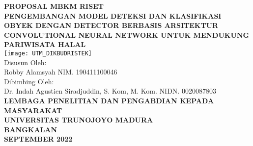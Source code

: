 \begin{titlepage}
\begin{center}
    \textbf{PROPOSAL MBKM RISET}\\[3\baselineskip]

    \textbf{PENGEMBANGAN MODEL DETEKSI DAN KLASIFIKASI OBYEK DENGAN DETECTOR BERBASIS ARSITEKTUR CONVOLUTIONAL NEURAL NETWORK UNTUK MENDUKUNG PARIWISATA HALAL}\\[8\baselineskip]

    \texttt{[image: UTM\_DIKBUDRISTEK]}\\[3\baselineskip]

    Disusun Oleh:\\
    Robby Alamsyah NIM. 190411100046\\[1\baselineskip]

    Dibimbing Oleh:\\
    Dr. Indah Agustien Siradjuddin, S. Kom, M. Kom. NIDN. 0020087803\\[8\baselineskip]


    \textbf{LEMBAGA PENELITIAN DAN PENGABDIAN KEPADA MASYARAKAT}\\
    \textbf{UNIVERSITAS TRUNOJOYO MADURA}\\
    \textbf{BANGKALAN}\\
    \textbf{SEPTEMBER 2022}
\end{center}
\end{titlepage}